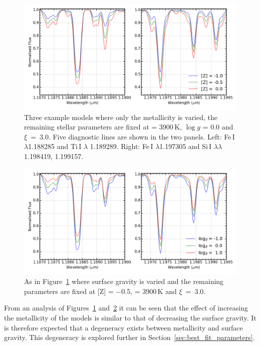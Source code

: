 \begin{figure}
 \centering
\includegraphics[width=\textwidth]{JAnal/varyZv2}
\caption[An example of the effect of metallicity on the appearance of the model gird spectra]{
Three example models where only the metallicity is varied, the remaining stellar parameters are fixed at \Teff = 3900\,K, $\log g$ = 0.0 and $\xi$~=~3.0\kms.
Five diagnostic lines are shown in the two panels.
Left: Fe\,I $\lambda$1.188285 and Ti\,I $\lambda$ 1.189289.
Right: Fe\,I $\lambda$1.197305 and Si\,I $\lambda\lambda$ 1.198419, 1.199157.\label{fig:mod-z}
         }
\end{figure}
\begin{figure}
 \centering
\includegraphics[width=\textwidth]{JAnal/varygv2}
\caption[An example of the effect of surface gravity on the appearance of the model gird spectra]{
As in Figure~\ref{fig:mod-z} where surface gravity is varied and the remaining parameters are fixed at [Z] = $-$0.5, \Teff = 3900\,K and $\xi$~=~3.0\kms.\label{fig:mod-g}
         }
\end{figure}


From an analysis of Figures~\ref{fig:mod-z} and~\ref{fig:mod-g} it can be seen that the effect of increasing the metallicity of the models is similar to that of decreasing the surface gravity.
It is therefore expected that a degeneracy exists between metallicity and surface gravity.
This degeneracy is explored further in Section~\ref{sec:best_fit_parameters}.

